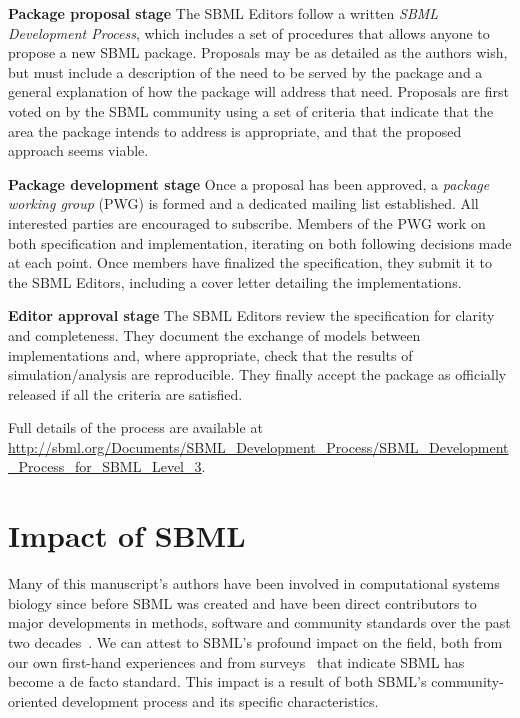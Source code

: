 \documentclass[]{draft-sbml-paper}
\begin{document}
\textbf{Package proposal stage}\newline
The SBML Editors follow a written \emph{SBML Development Process}, which includes a set of procedures that allows anyone to propose a new SBML package.  Proposals may be as detailed as the authors wish, but must include a description of the need to be served by the package and a general explanation of how the package will address that need.  Proposals are first voted on by the SBML community using a set of criteria that indicate that the area the package intends to address is appropriate, and that the proposed approach seems viable.

\textbf{Package development stage}\newline
Once a proposal has been approved, a \emph{package working group} (PWG) is formed and a dedicated mailing list established. All interested parties are encouraged to subscribe. Members of the PWG work on both specification and implementation, iterating on both following decisions made at each point. Once members have finalized the specification, they submit it to the SBML Editors, including a cover letter detailing the implementations.

\textbf{Editor approval stage}\newline
The SBML Editors review the specification for clarity and completeness. They document the exchange of models between implementations and, where appropriate, check that the results of simulation/analysis are reproducible. They finally accept the package as officially released if all the criteria are satisfied.

Full details of the process are available at \url{http://sbml.org/Documents/SBML_Development_Process/SBML_Development_Process_for_SBML_Level_3}.

\vspace{5\baselineskip}

\hrulefill
\newpage


\section*{Impact of SBML}


Many of this manuscript's authors have been involved in computational systems biology since before SBML was created and have been direct contributors to major developments in methods, software and community standards over the past two decades~\citep{Draeger2014, Hucka2015a, Brazma2006standards}.  We can attest to SBML's profound impact on the field, both from our own first-hand experiences and from surveys~\citep{Cvijovic2014bridginga, Klipp2007systems} that indicate SBML has become a de facto standard.  This impact is a result of both SBML's community-oriented development process and its specific characteristics.
\end{document}

